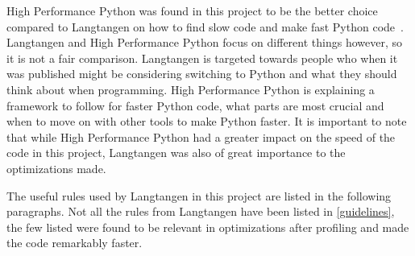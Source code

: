 \documentclass[12pt, a4paper]{article}
\begin{document}
High Performance Python was found in this project to be the better choice compared to Langtangen on how to find slow code and make fast Python code~\cite{oreilly}.
Langtangen and High Performance Python focus on different things however, so it is not a fair comparison.
Langtangen is targeted towards people who when it was published might be considering switching to Python and what they should think about when programming.
High Performance Python is explaining a framework to follow for faster Python code, what parts are most crucial and when to move on with other tools to make Python faster.
It is important to note that while High Performance Python had a greater impact on the speed of the code in this project, Langtangen was also of great importance to the optimizations made.


The useful rules used by Langtangen in this project are listed in the following paragraphs.
Not all the rules from Langtangen have been listed in \cref{guidelines}, the few listed were found to be relevant in optimizations after profiling and made the code remarkably faster.
\end{document}
